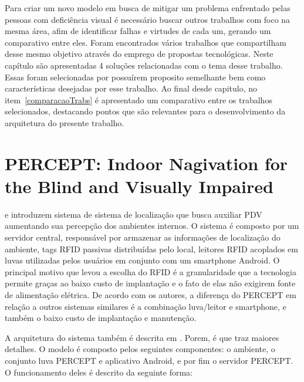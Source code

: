 \documentclass[english,brazilian]{UNISINOSmonografia}
\begin{document}
Para criar um novo modelo em busca de mitigar um problema enfrentado pelas pessoas com deficiência visual é necessário buscar outros trabalhos com foco na mesma área, afim de identificar falhas e virtudes de cada um, gerando um comparativo entre eles. Foram encontrados vários trabalhos que compartilham desse mesmo objetivo através do emprego de propostas tecnológicas. Neste capítulo são apresentadas 4 soluções relacionadas com o tema desse trabalho. Essas foram selecionadas por possuírem proposito semelhante bem como características desejadas por esse trabalho. Ao final desde capitulo, no item~\ref{comparacaoTrabs} é apresentado um comparativo entre os trabalhos selecionados, destacando pontos que são relevantes para o desenvolvimento da arquitetura do presente trabalho.

	\section{PERCEPT: Indoor Nagivation for the Blind and Visually Impaired}
 e  introduzem sistema de sistema de localização que busca auxiliar PDV aumentando sua percepção dos ambientes internos. O sistema é composto por um servidor central, responsável por armazenar as informações de localização do ambiente, tags RFID passivas distribuídas pelo local, leitores RFID acoplados em luvas utilizadas pelos usuários em conjunto com um smartphone Android. O principal motivo que levou a escolha do RFID é a granularidade que a tecnologia permite graças ao baixo custo de implantação e o fato de elas não exigirem fonte de alimentação elétrica. De acordo com os autores, a diferença do PERCEPT em relação a outros sistemas similares é a combinação luva/leitor e smartphone, e também o baixo custo de implantação e manutenção. 

A arquitetura do sistema também é descrita em . Porem,  é que traz maiores detalhes. O modelo é composto pelos seguintes componentes: o ambiente, o conjunto luva PERCEPT e aplicativo Android, e por fim o servidor PERCEPT. O funcionamento deles é descrito da seguinte forma:
\end{document}
